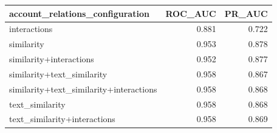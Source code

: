 \begin{tabular}{lrr}
\toprule
account_relations_configuration & ROC_AUC & PR_AUC \\
\midrule
interactions & 0.881 & 0.722 \\
similarity & 0.953 & 0.878 \\
similarity+interactions & 0.952 & 0.877 \\
similarity+text_similarity & 0.958 & 0.867 \\
similarity+text_similarity+interactions & 0.958 & 0.868 \\
text_similarity & 0.958 & 0.868 \\
text_similarity+interactions & 0.958 & 0.869 \\
\bottomrule
\end{tabular}
